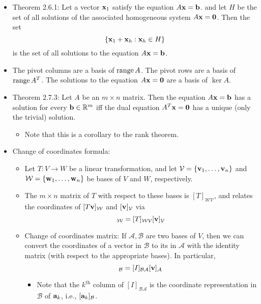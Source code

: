 \documentclass[../../notes.tex]{subfiles}
\begin{document}
\begin{itemize}
    \item Theorem 2.6.1: Let a vector $\mathbf{x}_1$ satisfy the equation $A\mathbf{x}=\mathbf{b}$. and let $H$ be the set of all solutions of the associated homogeneous system $A\mathbf{x}=\bm{0}$. Then the set
    \begin{equation*}
        \{\mathbf{x}_1+\mathbf{x}_h:\mathbf{x}_h\in H\}
    \end{equation*}
    is the set of all solutions to the equation $A\mathbf{x}=\mathbf{b}$.
    \item The pivot columns are a basis of $\operatorname{range} A$. The pivot rows are a basis of $\operatorname{range} A^T$. The solutions to the equation $A\mathbf{x}=\bm{0}$ are a basis of $\ker A$.
    \item Theorem 2.7.3: Let $A$ be an $m\times n$ matrix. Then the equation $A\mathbf{x}=\mathbf{b}$ has a solution for every $\mathbf{b}\in\mathbb{R}^m$ iff the dual equation $A^T\mathbf{x}=\bm{0}$ has a unique (only the trivial) solution.
    \begin{itemize}
        \item Note that this is a corollary to the rank theorem.
    \end{itemize}
    \item Change of coordinates formula:
    \begin{itemize}
        \item Let $T:V\to W$ be a linear transformation, and let $\mathcal{V}=\{\mathbf{v}_1,\dots,\mathbf{v}_n\}$ and $\mathcal{W}=\{\mathbf{w}_1,\dots,\mathbf{w}_n\}$ be bases of $V$ and $W$, respectively.
        \item The $m\times n$ matrix of $T$ with respect to these bases is $[T]_{\mathcal{W}\mathcal{V}}$, and relates the coordinates of $[T\mathbf{v}]_{\mathcal{W}}$ and $[\mathbf{v}]_{\mathcal{V}}$ via
        \begin{equation*}
            [T\vm]_{\mathcal{W}} = [T]_{\mathcal{W}\mathcal{V}}[\vm]_{\mathcal{V}}
        \end{equation*}
        \item Change of coordinates matrix: If $\mathcal{A},\mathcal{B}$ are two bases of $V$, then we can convert the coordinates of a vector in $\mathcal{B}$ to its in $\mathcal{A}$ with the identity matrix (with respect to the appropriate bases). In particular,
        \begin{equation*}
            [\vm]_{\mathcal{B}} = [I]_{\mathcal{B}\mathcal{A}}[\vm]_{\mathcal{A}}
        \end{equation*}
        \begin{itemize}
            \item Note that the $k^\text{th}$ column of $[I]_{\mathcal{B}\mathcal{A}}$ is the coordinate representation in $\mathcal{B}$ of $\mathbf{a}_k$, i.e., $[\mathbf{a}_k]_{\mathcal{B}}$.

\end{itemize}
\end{itemize}
\end{itemize}
\end{document}
